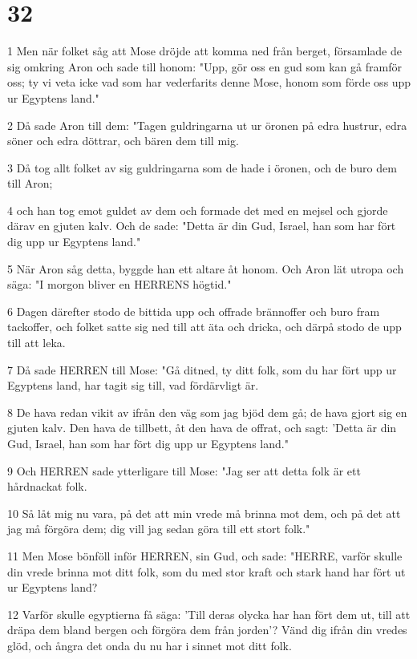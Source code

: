\chapter{32}

\par 1 Men när folket såg att Mose dröjde att komma ned från berget, församlade de sig omkring Aron och sade till honom: "Upp, gör oss en gud som kan gå framför oss; ty vi veta icke vad som har vederfarits denne Mose, honom som förde oss upp ur Egyptens land."
\par 2 Då sade Aron till dem: "Tagen guldringarna ut ur öronen på edra hustrur, edra söner och edra döttrar, och bären dem till mig.
\par 3 Då tog allt folket av sig guldringarna som de hade i öronen, och de buro dem till Aron;
\par 4 och han tog emot guldet av dem och formade det med en mejsel och gjorde därav en gjuten kalv. Och de sade: "Detta är din Gud, Israel, han som har fört dig upp ur Egyptens land."
\par 5 När Aron såg detta, byggde han ett altare åt honom. Och Aron lät utropa och säga: "I morgon bliver en HERRENS högtid."
\par 6 Dagen därefter stodo de bittida upp och offrade brännoffer och buro fram tackoffer, och folket satte sig ned till att äta och dricka, och därpå stodo de upp till att leka.
\par 7 Då sade HERREN till Mose: "Gå ditned, ty ditt folk, som du har fört upp ur Egyptens land, har tagit sig till, vad fördärvligt är.
\par 8 De hava redan vikit av ifrån den väg som jag bjöd dem gå; de hava gjort sig en gjuten kalv. Den hava de tillbett, åt den hava de offrat, och sagt: 'Detta är din Gud, Israel, han som har fört dig upp ur Egyptens land."
\par 9 Och HERREN sade ytterligare till Mose: "Jag ser att detta folk är ett hårdnackat folk.
\par 10 Så låt mig nu vara, på det att min vrede må brinna mot dem, och på det att jag må förgöra dem; dig vill jag sedan göra till ett stort folk."
\par 11 Men Mose bönföll inför HERREN, sin Gud, och sade: "HERRE, varför skulle din vrede brinna mot ditt folk, som du med stor kraft och stark hand har fört ut ur Egyptens land?
\par 12 Varför skulle egyptierna få säga: 'Till deras olycka har han fört dem ut, till att dräpa dem bland bergen och förgöra dem från jorden'? Vänd dig ifrån din vredes glöd, och ångra det onda du nu har i sinnet mot ditt folk.

